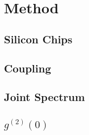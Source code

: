 \section{Method}
\subsection{Silicon Chips}
\subsection{Coupling}
\subsection{Joint Spectrum}
\subsection{$g^{(2)}(0)$}